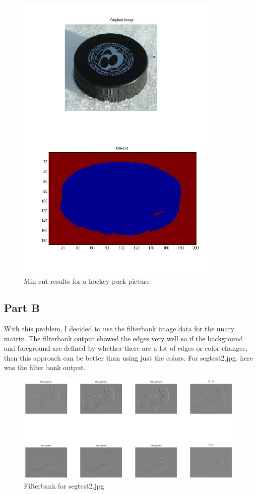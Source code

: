\documentclass[11pt,psfig]{article}
\begin{document}
\begin{figure}[H]
\centering
\includegraphics[width=4in]{prob5plotA_3.jpg}
\caption{Min cut results for a hockey puck picture}
\end{figure}

\subsection*{Part B}

With this problem, I decided to use the filterbank image data for the unary matrix. The filterbank output showed the edges very well so if the background and foreground are defined by whether there are a lot of edges or color changes, then this approach can be better than using just the colors. For segtest2.jpg, here was the filter bank output. 

\begin{figure}[H]
\centering
\includegraphics[width=7in]{prob5plotB_1_filter.jpg}
\caption{Filterbank for segtest2.jpg}
\end{figure}
\end{document}
